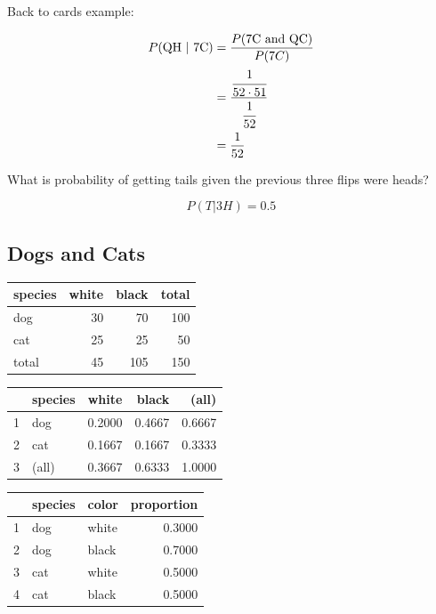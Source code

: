 \documentclass[landscape]{exam}
\begin{document}
  Back to cards example:
  \begin{solution}
    \begin{align*}
    P(\text{QH } | \text{ 7C})  & = \frac{P(\text{7C and QC})}{P(7C)} \\
                                & = \frac{\cfrac{1}{52 \cdot 51}}{\cfrac{1}{52}} \\
                                & = \frac{1}{52} \\
    \end{align*}
  \end{solution}

  What is probability of getting tails given the previous three flips were heads?
  \begin{solution}
    \[
      P(T | 3H) = 0.5
    \]
  \end{solution}

  \subsection{Dogs and Cats}
  \begin{table}[H]
    \begin{tabular}[H]{lrrr}
      \toprule
      species & white & black & total\\
      \midrule
      dog     & 30    & 70    & 100\\
      cat     & 25    & 25    & 50\\
      \midrule
      total   & 45    & 105   & 150\\
      \bottomrule
    \end{tabular}
  \end{table}

  \begin{table}[H]
    \begin{tabular}{rlrrr}
      \toprule
        & species & white  & black  & (all) \\
      \midrule
      1 & dog     & 0.2000 & 0.4667 & 0.6667 \\
      2 & cat     & 0.1667 & 0.1667 & 0.3333 \\
      \midrule
      3 & (all)   & 0.3667 & 0.6333 & 1.0000 \\
      \bottomrule
    \end{tabular}
  \end{table}

  \begin{table}[ht]
    \begin{tabular}{rllr}
      \toprule
         & species & color & proportion \\
      \midrule
      1  & dog     & white & 0.3000 \\
      2  & dog     & black & 0.7000 \\
      \midrule
      3  & cat     & white & 0.5000 \\
      4  & cat     & black & 0.5000 \\
      \bottomrule
    \end{tabular}
  \end{table}
\end{document}
